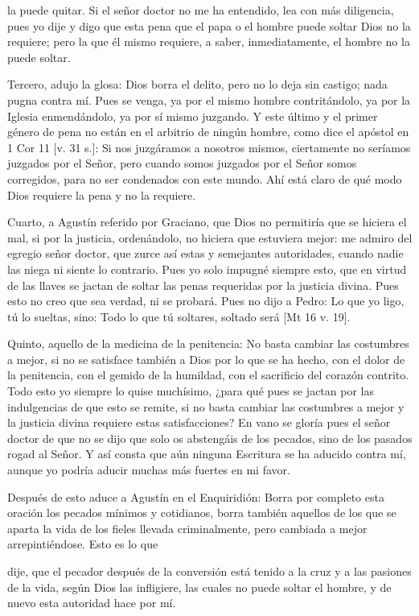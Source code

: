 la puede quitar. Si el señor doctor no me ha entendido, lea con más diligencia, pues yo dije y digo que esta pena que el papa o el hombre puede soltar Dios no la requiere; pero la que él mismo requiere, a saber, inmediatamente, el hombre no la puede soltar.

Tercero, adujo la glosa: Dios borra el delito, pero no lo deja sin castigo; nada pugna contra mí. Pues se venga, ya por el mismo hombre contritándolo, ya por la Iglesia enmendándolo, ya por sí mismo juzgando. Y este último y el primer género de pena no están en el arbitrio de ningún hombre, como dice el apóstol en 1 Cor 11 [v. 31 s.]: Si nos juzgáramos a nosotros mismos, ciertamente no seríamos juzgados por el Señor, pero cuando somos juzgados por el Señor somos corregidos, para no ser condenados con este mundo. Ahí está claro de qué modo Dios requiere la pena y no la requiere.

Cuarto, a Agustín referido por Graciano, que Dios no permitiría que se hiciera el mal, si por la justicia, ordenándolo, no hiciera que estuviera mejor: me admiro del egregio señor doctor, que zurce así estas y semejantes autoridades, cuando nadie las niega ni siente lo contrario. Pues yo solo impugné siempre esto, que en virtud de las llaves se jactan de soltar las penas requeridas por la justicia divina. Pues esto no creo que sea verdad, ni se probará. Pues no dijo a Pedro: Lo que yo ligo, tú lo sueltas, sino: Todo lo que tú soltares, soltado será [Mt 16 v. 19].

Quinto, aquello de la medicina de la penitencia: No basta cambiar las costumbres a mejor, si no se satisface también a Dios por lo que se ha hecho, con el dolor de la penitencia, con el gemido de la humildad, con el sacrificio del corazón contrito. Todo esto yo siempre lo quise muchísimo, ¿para qué pues se jactan por las indulgencias de que esto se remite, si no basta cambiar las costumbres a mejor y la justicia divina requiere estas satisfacciones? En vano se gloría pues el señor doctor de que no se dijo que solo os abstengáis de los pecados, sino de los pasados rogad al Señor. Y así consta que aún ninguna Escritura se ha aducido contra mí, aunque yo podría aducir muchas más fuertes en mi favor.

Después de esto aduce a Agustín en el Enquiridión: Borra por completo esta oración los pecados mínimos y cotidianos, borra también aquellos de los que se aparta la vida de los fieles llevada criminalmente, pero cambiada a mejor arrepintiéndose. Esto es lo que

dije, que el pecador después de la conversión está tenido a la cruz y a las pasiones de la vida, según Dios las infligiere, las cuales no puede soltar el hombre, y de nuevo esta autoridad hace por mí.

